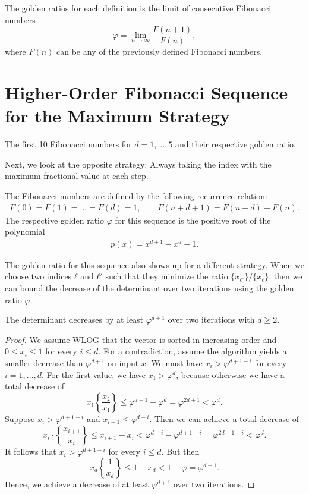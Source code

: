 The golden ratios for each definition is the limit of consecutive Fibonacci numbers
\[
  φ = \lim_{n → ∞} \frac{F(n + 1)}{F(n)},
\]
where $F(n)$ can be any of the previously defined Fibonacci numbers.

\section{Higher-Order Fibonacci Sequence for the Maximum Strategy}

\begin{table}[tbp]
  \caption{The first 10 Fibonacci numbers for $d = 1, …, 5$ and their respective golden ratio.}
  \label{tbl:max-fibonacci}
  \centering
  
\end{table}

Next, we look at the opposite strategy:
Always taking the index with the maximum fractional value at each step.

The Fibonacci numbers are defined by the following recurrence relation:
\begin{align*}
  F(0) = F(1) = \dots = F(d) = 1, \qquad F(n + d + 1) = F(n + d) + F(n).
\end{align*}
The respective golden ratio $φ$ for this sequence is the positive root of the polynomial
\begin{align*}
  p(x) = x^{d+1} - x^d - 1.
\end{align*}

The golden ratio for this sequence also shows up for a different strategy.
When we choose two indices $ℓ$ and $ℓ'$ such that they minimize the ratio
$\{x_{ℓ'}\}/\{x_{ℓ}\}$, then we can bound the decrease of the determinant over
two iterations using the golden ratio $φ$.

\begin{theorem}
  The determinant decreases by at least $φ^{d+1}$ over two iterations with $d ≥ 2$.
\end{theorem}

\begin{proof}
  We assume WLOG that the vector is sorted in increasing order and
  $0 ≤ x_i ≤ 1$ for every $i ≤ d$.
  For a contradiction, assume the algorithm yields a smaller decrease than $φ^{d+1}$ on input $x$.
  We must have $x_i > φ^{d+1-i}$ for every $i = 1, \dots, d$.
  For the first value, we have $x₁ > φ^d$, because otherwise we have a total decrease of
  \[
    x₁ \left\{ \frac{x₂}{x₁} \right\} ≤ φ^{d-1} - φ^d = φ^{2d+1} < φ^d.
  \]
  Suppose $x_i > φ^{d+1-i}$ and $x_{i+1} ≤ φ^{d-i}$.
  Then we can achieve a total decrease of
  \[
    x_i · \left\{ \frac{x_{i+1}}{x_i} \right\} ≤ x_{i+1} - x_i < φ^{d-i} - φ^{d+1-i} = φ^{2d+1-i} < φ^d.
  \]
  It follows that $x_i > φ^{d+1-i}$ for every $i ≤ d$.
  But then
  \[
    x_d \left\{ \frac{1}{x_d} \right\} ≤ 1 - x_d < 1 - φ = φ^{d+1}.
  \]
  Hence, we achieve a decrease of at least $φ^{d+1}$ over two iterations.
\end{proof}

